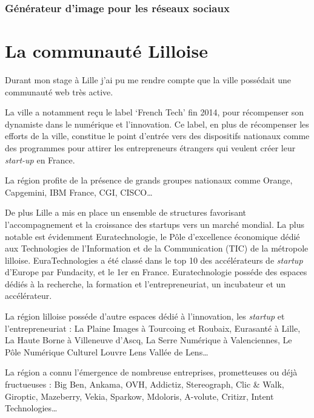 \subsubsection{Générateur d'image pour les réseaux
sociaux}\label{guxe9nuxe9rateur-dimage-pour-les-ruxe9seaux-sociaux}

\newpage

\section{La communauté Lilloise}\label{la-communautuxe9-lilloise}

Durant mon stage à Lille j'ai pu me rendre compte que la ville possédait
une communauté web très active.

\bigskip

La ville a notamment reçu le label `French Tech' fin 2014, pour
récompenser son dynamiste dans le numérique et l'innovation. Ce label,
en plus de récompenser les efforts de la ville, constitue le point
d'entrée vers des dispositifs nationaux comme des programmes pour
attirer les entrepreneurs étrangers qui veulent créer leur
\emph{start-up} en France.

\bigskip

La région profite de la présence de grands groupes nationaux comme
Orange, Capgemini, IBM France, CGI, CISCO\ldots{}

\bigskip

De plus Lille a mis en place un ensemble de structures favorisant
l'accompagnement et la croissance des startups vers un marché mondial.
La plus notable est évidemment Euratechnologie, le Pôle d'excellence
économique dédié aux Technologies de l'Information et de la
Communication (TIC) de la métropole lilloise. EuraTechnologies a été
classé dans le top 10 des accélérateurs de \emph{startup} d'Europe par
Fundacity, et le 1er en France. Euratechnologie posséde des espaces
dédiés à la recherche, la formation et l'entrepreneuriat, un incubateur
et un accélérateur.

\bigskip

La région lilloise posséde d'autre espaces dédié à l'innovation, les
\emph{startup} et l'entrepreneuriat : La Plaine Images à Tourcoing et
Roubaix, Eurasanté à Lille, La Haute Borne à Villeneuve d'Ascq, La Serre
Numérique à Valenciennes, Le Pôle Numérique Culturel Louvre Lens Vallée
de Lens\ldots{}

\bigskip

La région a connu l'émergence de nombreuse entreprises, prometteuses ou
déjà fructueuses : Big Ben, Ankama, OVH, Addictiz, Stereograph, Clic \&
Walk, Giroptic, Mazeberry, Vekia, Sparkow, Mdoloris, A-volute, Critizr,
Intent Technologies\ldots{}

